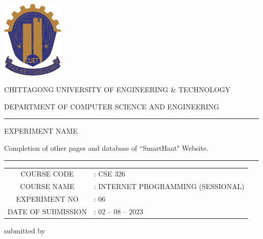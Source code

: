 \documentclass[a4paper,12pt]{report}
\begin{document}
\begin{titlepage}

	\centering

	\includegraphics[width=3cm, keepaspectratio]{cuet.png} \par \vspace{0.5cm}
	\begin{Large}
		CHITTAGONG UNIVERSITY OF ENGINEERING \& TECHNOLOGY
	\end{Large}
	\par
	\vspace{.5cm}
	{DEPARTMENT OF COMPUTER SCIENCE AND ENGINEERING}
\vspace{1cm}

	\raisebox{-\baselineskip}{\rule{\textwidth}{1px}}
	\rule{\textwidth}{1px}

\vspace{0.2cm}
{\large{{EXPERIMENT NAME}}}\par \vspace{0.3cm}
\Large{{Completion of other pages and  database of ``SmartHaat" Website.}}
	\rule{\textwidth}{2px}

\vspace{0.5cm}

	\normalsize
\begin{tabular}{cl}
COURSE CODE        & : CSE 326                          \\
COURSE NAME        & : INTERNET PROGRAMMING (SESSIONAL) \\
EXPERIMENT NO      & : 06                               \\
DATE OF SUBMISSION & : 02 -- 08 -- 2023
\end{tabular}
\vspace{0.5cm}

	\parbox[l]{9cm}{
		\begin{center}
			submitted by
		\end{center}

}
\end{titlepage}
\end{document}

